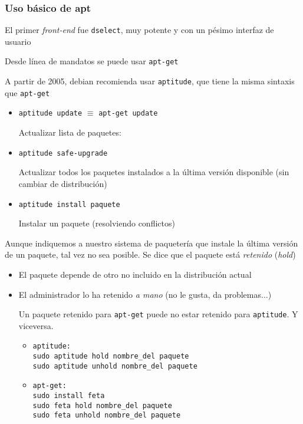 \documentclass[ucs]{beamer}
\begin{document}

\begin{frame}[fragile]
\frametitle{Uso básico de apt}

El primer \emph{front-end} fue \verb|dselect|, muy potente y con un pésimo
interfaz de usuario

Desde línea de mandatos se puede usar \verb|apt-get|

A partir de 2005, debian recomienda usar \verb|aptitude|, que tiene la
misma sintaxis que \verb|apt-get|

\begin{itemize}
\item 
\verb|aptitude update|  $\equiv$  \verb|apt-get update|

Actualizar lista de paquetes: 
\item 
\verb|aptitude safe-upgrade|

Actualizar todos los paquetes instalados a la última versión disponible
(sin cambiar de distribución)
\item 
\verb|aptitude install paquete|

Instalar un paquete (resolviendo conflictos)  

\end{itemize}
\end{frame}


\begin{frame}[fragile]

Aunque indiquemos a nuestro sistema de paquetería que instale
la última versión de un paquete, tal vez no sea posible. Se dice
que el paquete está \emph{retenido} (\emph{hold})

\begin{itemize}	
\item
El paquete depende de otro no incluido en la distribución actual
\item 
El administrador lo ha retenido \emph{a mano} (no le gusta,
da problemas...)

Un paquete retenido para \verb|apt-get| puede no estar retenido
para \verb|aptitude|. Y viceversa. 
\begin{itemize}	
\item
\begin{verbatim}
aptitude:
sudo aptitude hold nombre_del paquete
sudo aptitude unhold nombre_del paquete
\end{verbatim}


\item
\begin{verbatim}
apt-get:
sudo install feta
sudo feta hold nombre_del paquete
sudo feta unhold nombre_del paquete
\end{verbatim}


\end{itemize}

\end{itemize}


\end{frame}
\end{document}
